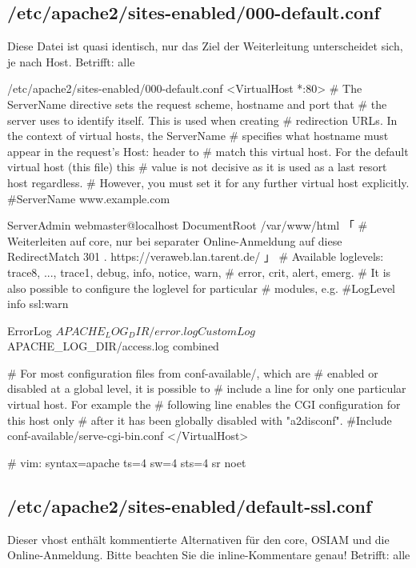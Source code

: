\documentclass{tarentanleitung}
\begin{document}
\subsection{/etc/apache2/sites-enabled/000-default.conf}\label{subsec:refcfg-apache-default}

Diese Datei ist quasi identisch, nur das Ziel der Weiterleitung
unterscheidet sich, je nach Host. Betrifft: alle

\begin{lstdump}[tabsize=2]{/etc/apache2/sites-enabled/000-default.conf}
<VirtualHost *:80>
	# The ServerName directive sets the request scheme, hostname and port that
	# the server uses to identify itself. This is used when creating
	# redirection URLs. In the context of virtual hosts, the ServerName
	# specifies what hostname must appear in the request's Host: header to
	# match this virtual host. For the default virtual host (this file) this
	# value is not decisive as it is used as a last resort host regardless.
	# However, you must set it for any further virtual host explicitly.
	#ServerName www.example.com

	ServerAdmin webmaster@localhost
	DocumentRoot /var/www/html
「
	# Weiterleiten auf core, nur bei separater Online-Anmeldung auf diese
	RedirectMatch 301 . https://veraweb.lan.tarent.de/
」
	# Available loglevels: trace8, ..., trace1, debug, info, notice, warn,
	# error, crit, alert, emerg.
	# It is also possible to configure the loglevel for particular
	# modules, e.g.
	#LogLevel info ssl:warn

	ErrorLog ${APACHE_LOG_DIR}/error.log
	CustomLog ${APACHE_LOG_DIR}/access.log combined

	# For most configuration files from conf-available/, which are
	# enabled or disabled at a global level, it is possible to
	# include a line for only one particular virtual host. For example the
	# following line enables the CGI configuration for this host only
	# after it has been globally disabled with "a2disconf".
	#Include conf-available/serve-cgi-bin.conf
</VirtualHost>

# vim: syntax=apache ts=4 sw=4 sts=4 sr noet
\end{lstdump}

\subsection{/etc/apache2/sites-enabled/default-ssl.conf}\label{subsec:refcfg-apache-defssl}

Dieser vhost enthält kommentierte Alternativen für den core,
OSIAM und die Online-Anmeldung. Bitte beachten Sie die
inline-Kommentare genau! Betrifft: alle
\end{document}
